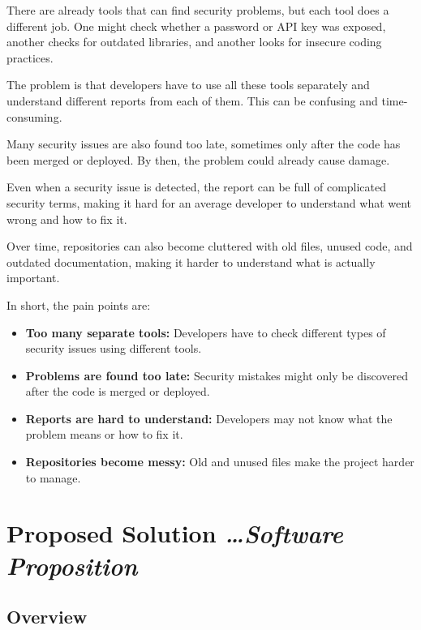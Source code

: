\documentclass[11pt,a4paper]{article}
\newcommand{\BvrHint}[1]{%
  {\normalfont\normalsize\itshape\hfill #1}}
\begin{document}
There are already tools that can find security problems, but each tool does a different job. One might check whether a password or API key was exposed, another checks for outdated libraries, and another looks for insecure coding practices.

The problem is that developers have to use all these tools separately and understand different reports from each of them. This can be confusing and time-consuming.

Many security issues are also found too late, sometimes only after the code has been merged or deployed. By then, the problem could already cause damage.

Even when a security issue is detected, the report can be full of complicated security terms, making it hard for an average developer to understand what went wrong and how to fix it.

Over time, repositories can also become cluttered with old files, unused code, and outdated documentation, making it harder to understand what is actually important.

In short, the pain points are:

\begin{itemize}[leftmargin=0.7cm]

    \item \textbf{Too many separate tools:} Developers have to check different types of security issues using different tools.

    \item \textbf{Problems are found too late:} Security mistakes might only be discovered after the code is merged or deployed.

    \item \textbf{Reports are hard to understand:} Developers may not know what the problem means or how to fix it.

    \item \textbf{Repositories become messy:} Old and unused files make the project harder to manage.

\end{itemize}

\section{Proposed Solution
  \BvrHint{\ldots Software Proposition}}

\subsection{Overview}
\end{document}
